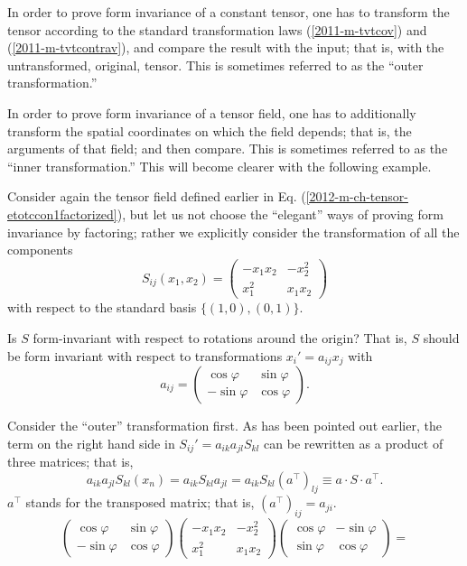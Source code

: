 In order to prove form invariance of a constant tensor,
one has to transform the tensor according to the standard transformation laws
(\ref{2011-m-tvtcov}) and (\ref{2011-m-tvtcontrav}), and compare the result with the input;
that is, with the untransformed, original, tensor.
This is sometimes referred to as the ``outer transformation.''


In order to prove form invariance of a tensor field,
one has to additionally transform the spatial coordinates on which the field depends;
that is, the arguments of that field; and then compare.
This is sometimes referred to as the ``inner transformation.''
This will become clearer with the following example.

{
\color{blue}
\bexample


Consider again the tensor field defined
earlier in Eq.
(\ref{2012-m-ch-tensor-etotccon1factorized}),
but let us not choose the ``elegant''
ways of proving form invariance by factoring; rather we explicitly
consider the transformation of all the  components
$$S_{ij}(x_1,x_2)
=
\begin{pmatrix}
 -x_1x_2 & - x_2^2  \\
 x_1^2 & x_1x_2
\end{pmatrix}
$$
with respect to the standard basis  $\{(1,0), (0,1)\}$.

Is $S$ form-invariant with respect to rotations around the origin?
That is, $S$ should be form invariant with respect to transformations
$x_i' = a_{ij} x_j$
with
$$
a_{ij}=\begin{pmatrix}
 \cos \varphi & \sin \varphi  \\
  -\sin \varphi & \cos \varphi
\end{pmatrix}.
$$


Consider the ``outer'' transformation first.
As has been pointed out earlier,
the term on the right hand side in $
S_{ij}'= a_{ik}a_{jl}S_{kl}
$
can be rewritten as a product of three matrices; that is,
$$
a_{ik}a_{jl}S_{kl}\left(x_n\right)
=  a_{ik}S_{kl}a_{jl}
=  a_{ik}S_{kl}\left(a^\intercal  \right)_{lj}
\equiv a\cdot S\cdot a^\intercal  .
$$
$a^\intercal $ stands for the transposed matrix; that is,
$(a^\intercal )_{ij}=a_{ji}$.
$$
  \left(
    \begin{array}{cc}
      \cos \varphi  & \sin \varphi \\
      -\sin \varphi & \cos \varphi
    \end{array}
  \right)
  \left(
    \begin{array}{cc}
      -x_1x_2 & -x_2^2 \\
      x_1^2   & x_1x_2
    \end{array}
  \right)
  \left(
    \begin{array}{cc}
      \cos \varphi  & -\sin \varphi \\
      \sin \varphi & \cos \varphi
    \end{array}
  \right)=
$$

}

